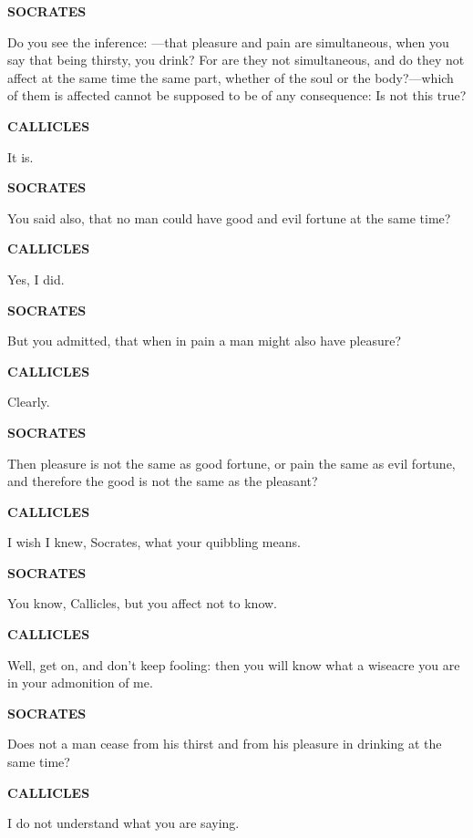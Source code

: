 \documentclass[11pt,letter]{article}
\begin{document}
\par \textbf{SOCRATES}
\par   Do you see the inference: —that pleasure and pain are simultaneous, when you say that being thirsty, you drink? For are they not simultaneous, and do they not affect at the same time the same part, whether of the soul or the body?—which of them is affected cannot be supposed to be of any consequence:  Is not this true?

\par \textbf{CALLICLES}
\par   It is.

\par \textbf{SOCRATES}
\par   You said also, that no man could have good and evil fortune at the same time?

\par \textbf{CALLICLES}
\par   Yes, I did.

\par \textbf{SOCRATES}
\par   But you admitted, that when in pain a man might also have pleasure?

\par \textbf{CALLICLES}
\par   Clearly.

\par \textbf{SOCRATES}
\par   Then pleasure is not the same as good fortune, or pain the same as evil fortune, and therefore the good is not the same as the pleasant?

\par \textbf{CALLICLES}
\par   I wish I knew, Socrates, what your quibbling means.

\par \textbf{SOCRATES}
\par   You know, Callicles, but you affect not to know.

\par \textbf{CALLICLES}
\par   Well, get on, and don’t keep fooling:  then you will know what a wiseacre you are in your admonition of me.

\par \textbf{SOCRATES}
\par   Does not a man cease from his thirst and from his pleasure in drinking at the same time?

\par \textbf{CALLICLES}
\par   I do not understand what you are saying.
\end{document}
